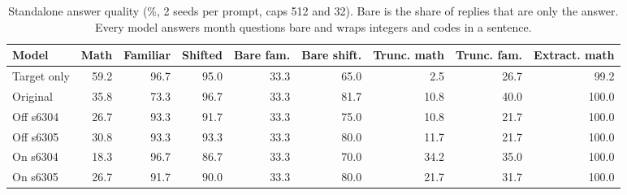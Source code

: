\begin{table}[!htb]
\centering
\scriptsize
\setlength{\tabcolsep}{3.5pt}
\caption{Standalone answer quality (\%, 2 seeds per prompt, caps 512 and 32). Bare is the share of replies that are only the answer. Every model answers month questions bare and wraps integers and codes in a sentence.}
\label{tab:t3quality}
\begin{adjustbox}{max width=\linewidth}
\begin{tabular}{lrrrrrrrr}
\toprule
Model & Math & Familiar & Shifted & Bare fam. & Bare shift. & Trunc. math & Trunc. fam. & Extract. math \\
\midrule
Target only & 59.2 & 96.7 & 95.0 & 33.3 & 65.0 & 2.5 & 26.7 & 99.2 \\
Original & 35.8 & 73.3 & 96.7 & 33.3 & 81.7 & 10.8 & 40.0 & 100.0 \\
Off s6304 & 26.7 & 93.3 & 91.7 & 33.3 & 75.0 & 10.8 & 21.7 & 100.0 \\
Off s6305 & 30.8 & 93.3 & 93.3 & 33.3 & 80.0 & 11.7 & 21.7 & 100.0 \\
On s6304 & 18.3 & 96.7 & 86.7 & 33.3 & 70.0 & 34.2 & 35.0 & 100.0 \\
On s6305 & 26.7 & 91.7 & 90.0 & 33.3 & 80.0 & 21.7 & 31.7 & 100.0 \\
\bottomrule
\end{tabular}
\end{adjustbox}
\end{table}
